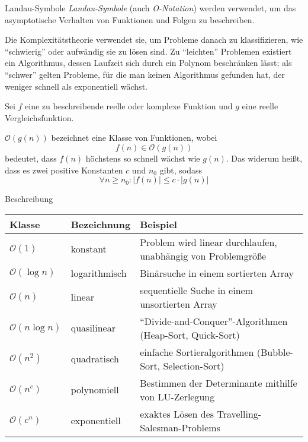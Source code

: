 \begin{defi}{Landau-Symbole}
    \emph{Landau-Symbole} (auch \emph{O-Notation}) werden verwendet, um das asymptotische Verhalten von Funktionen und Folgen zu beschreiben.

    Die Komplexitätstheorie verwendet sie, um Probleme danach zu klassifizieren, wie \enquote{schwierig} oder aufwändig sie zu lösen sind.
    Zu \enquote{leichten} Problemen existiert ein Algorithmus, dessen Laufzeit sich durch ein Polynom beschränken lässt;
    als \enquote{schwer} gelten Probleme, für die man keinen Algorithmus gefunden hat, der weniger schnell als exponentiell wächst.

    Sei $f$ eine zu beschreibende reelle oder komplexe Funktion und $g$ eine reelle Vergleichsfunktion.

    $\mathcal{O}(g(n))$ bezeichnet eine Klasse von Funktionen, wobei
    \[ f(n) \in \mathcal{O}(g(n)) \]
    bedeutet, dass $f(n)$ höchstens so schnell wächst wie $g(n)$.
    Das widerum heißt, dass es zwei positive Konstanten $c$ und $n_0$ gibt, sodass
    \[ \forall n \geq n_0 : | f(n) | \leq c \cdot | g(n) | \]
\end{defi}

\begin{example}[Komplexitätsklassen]{Beschreibung}
    \begin{tabularx}{\linewidth}{llX}
        \toprule
        Klasse                  & Bezeichnung   & Beispiel                                                         \\
        \midrule
        $\mathcal{O}(1)$        & konstant      & Problem wird linear durchlaufen, unabhängig von Problemgröße     \\
        $\mathcal{O}(\log n)$   & logarithmisch & Binärsuche in einem sortierten Array                             \\
        $\mathcal{O}(n)$        & linear        & sequentielle Suche in einem unsortierten Array                   \\
        $\mathcal{O}(n \log n)$ & quasilinear   & \enquote{Divide-and-Conquer}-Algorithmen (Heap-Sort, Quick-Sort) \\
        $\mathcal{O}(n^2)$      & quadratisch   & einfache Sortieralgorithmen (Bubble-Sort, Selection-Sort)        \\
        $\mathcal{O}(n^c)$      & polynomiell   & Bestimmen der Determinante mithilfe von LU-Zerlegung             \\
        $\mathcal{O}(c^n)$      & exponentiell  & exaktes Lösen des Travelling-Salesman-Problems                   \\
        \bottomrule
    \end{tabularx}
\end{example}

